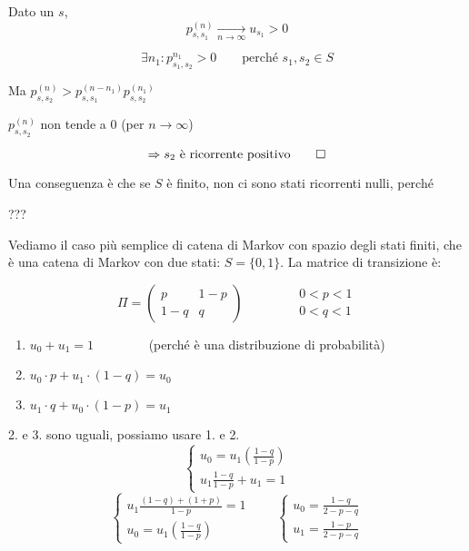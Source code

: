 \documentclass[a4paper,12pt]{book}
\newcommand\ddfrac[2]{\frac{\displaystyle #1}{\displaystyle #2}}
\begin{document}
Dato un $ s $,
$$ p_{s,s{_1}}^{(n)} \underset{n \to \infty}{\longrightarrow} u_{s_{1}} > 0$$

$$ \exists n_1 : p_{s_1, s_2}^{n_1} > 0 \qquad \text{perché } s_1, s_2 \in S  $$

Ma $ p_{s,s_2}^{(n)} > p_{s,s_1}^{(n - n_1)} p_{s,s_2}^{(n_1)} $

$ p_{s,s_2}^{(n)} $ non tende a 0 (per $ n \to \infty $)

$$ \Rightarrow s_2 \text{ è ricorrente positivo} \qed $$

Una conseguenza è che se $ S $ è finito, non ci sono stati ricorrenti nulli, perché 


??? %

Vediamo il caso più semplice di catena di Markov con spazio degli stati finiti, che è una catena di Markov con due stati: $ S = \{0,1\} $. La matrice di transizione è: %

$$ \Pi = \left(\begin{matrix}
	p & 1-p \\
	1-q & q
	\end{matrix}\right)  \qquad \qquad 
	\begin{array}{c} 
		0 < p < 1 \\ 
		0 < q < 1 
	\end{array}
$$

\begin{enumerate}
	\item $ u_0 + u_1 = 1 \qquad \qquad $ (perché è una distribuzione di probabilità)
	\item $u_0 \cdot p + u_1 \cdot (1-q) = u_0 $
	\item $u_1 \cdot q + u_0 \cdot (1-p) = u_1 $
\end{enumerate}

2. e 3. sono uguali, possiamo usare 1. e 2. 
$$ \begin{cases*}
	u_0 = u_1\left(\ddfrac{1-q}{1-p}\right) \\
	u_1\ddfrac{1-q}{1-p} + u_1 = 1
\end{cases*}$$
$$  
	\begin{cases*}
		u_1 \ddfrac{(1-q)+(1+p)}{1-p} = 1 \\
		u_0 = u_1(\ddfrac{1-q}{1-p})
	\end{cases*}
	\qquad 
	\begin{cases*}
		u_0 = \ddfrac{1-q}{2-p-q} \\
		u_1 = \ddfrac{1-p}{2-p-q} 
	\end{cases*}
$$
\end{document}
